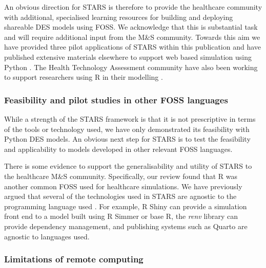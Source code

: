 \documentclass[]{interact}
\theoremstyle{plain}%
\theoremstyle{definition}
\theoremstyle{remark}
\begin{document}
An obvious direction for STARS is therefore to provide the healthcare community with additional, specialised learning resources for building and deploying shareable DES models using FOSS.  We acknowledge that this is substantial task and will require additional input from the M\&S community.  Towards this aim we have provided three pilot applications of STARS within this publication and have published extensive materials elsewhere to support web based simulation using Python \citep{monks2023improving, tom_monks_2023_8101984}.  The Health Technology Assessment community have also been working to support researchers using R in their modelling \citep{smith_hta_r_2022, shiney_paper, smith_packaging}.


\subsubsection{Feasibility and pilot studies in other FOSS languages}

While a strength of the STARS framework is that it is not prescriptive in terms of the tools or technology used, we have only demonstrated its feasibility with Python DES models. An obvious next step for STARS is to test the feasibility and applicability to models developed in other relevant FOSS languages.

There is some evidence to support the generalisability and utility of STARS to the healthcare M\&S community. Specifically, 
our review found that R was another common FOSS used for healthcare simulations. We have previously argued that several of the technologies used in STARS are agnostic to the programming language used \citep{harper_monks_2023_framework}. For example, R Shiny can provide a simulation front end to a model built using R Simmer or base R, the \textit{renv} library \citep{renv} can provide dependency management, and publishing systems such as Quarto are agnostic to languages used. 

\subsubsection{Limitations of remote computing}
\end{document}
